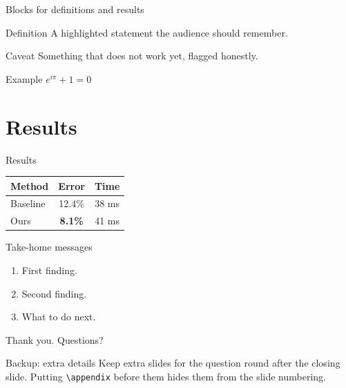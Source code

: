 \documentclass[aspectratio=169,11pt]{beamer}
\begin{document}
\begin{frame}{Blocks for definitions and results}
  \begin{block}{Definition}
    A highlighted statement the audience should remember.
  \end{block}
  \begin{alertblock}{Caveat}
    Something that does not work yet, flagged honestly.
  \end{alertblock}
  \begin{exampleblock}{Example}
    $e^{i\pi} + 1 = 0$
  \end{exampleblock}
\end{frame}

\section{Results}
\begin{frame}{Results}
  \centering
  \begin{tabular}{lcc}
    \toprule
    Method & Error & Time \\
    \midrule
    Baseline & 12.4\% & 38 ms \\
    Ours & \textbf{8.1\%} & 41 ms \\
    \bottomrule
  \end{tabular}
\end{frame}

\begin{frame}{Take-home messages}
  \begin{enumerate}
    \item First finding.
    \item Second finding.
    \item What to do next.
  \end{enumerate}
  \vfill\centering\Large Thank you. Questions?
\end{frame}

\begin{frame}{Backup: extra details}
  Keep extra slides for the question round after the closing slide. Putting
  \texttt{\textbackslash appendix} before them hides them from the slide numbering.
\end{frame}
\end{document}
